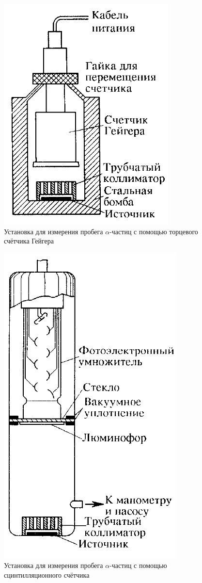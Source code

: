 \documentclass[a4paper, 12pt]{article}
\begin{document}
\begin{figure}[!h]
    \includegraphics[scale = 0.4]{Workplace1}
    \centering
    \caption{Установка для измерения пробега $\alpha$-частиц с помощью торцевого счётчика Гейгера}
    \label{img:work1}
\end{figure}

\begin{figure}[!h]
    \includegraphics[scale = 0.4]{Workplace2}
    \centering
    \caption{Установка для измерения пробега $\alpha$-частиц с помощью сцинтилляционного счётчика}
    \label{img:work2}
\end{figure}
\end{document}
